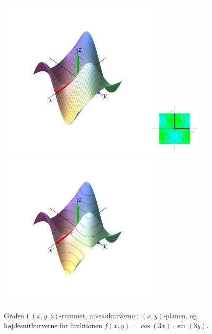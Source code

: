 \begin{figure}[h]
\centerline{\includegraphics[height=80mm]{plotCosSin.pdf}\quad \includegraphics[height=25mm]{plotCosSinNiveau.pdf} \quad \includegraphics[height=80mm]{plotCosSinNiveauUP.pdf}}
\begin{center}
\caption{Grafen i $(x,y,z)$-rummet, niveaukurverne i $(x,y)$-planen, og højdesnitkurverne for funktionen $f(x,y) = \cos(3x)\cdot\sin(3y)$.} \label{figCosSin}
\end{center}
\end{figure}



